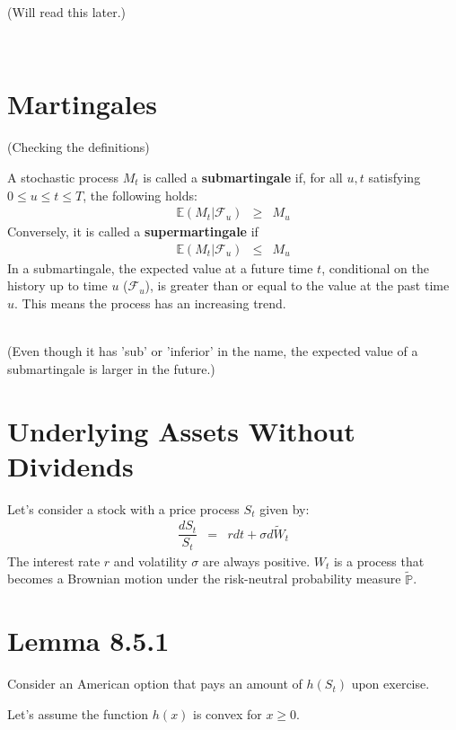 \documentclass[uplatex,a4j,12pt,dvipdfmx]{jsarticle}
\begin{document}
(Will read this later.)

\ \\

\section{Martingales}

(Checking the definitions)

A stochastic process $M_t$ is called a \textbf{submartingale} if, for all $u, t$ satisfying $0 \leq u \leq t \leq T$, the following holds:
%
%
\begin{eqnarray*}
	\mathbb{E}(M_{t}|\mathcal{F}_{u})
	&\geq&
	M_{u}
\end{eqnarray*}
%
%
Conversely, it is called a \textbf{supermartingale} if
%
%
\begin{eqnarray*}
	\mathbb{E}(M_{t}|\mathcal{F}_{u})
	&\leq&
	M_{u}
\end{eqnarray*}
%
%
In a submartingale, the expected value at a future time $t$, conditional on the history up to time $u$ ($\mathcal{F}_u$), is greater than or equal to the value at the past time $u$. This means the process has an increasing trend.

\ \\

(Even though it has 'sub' or 'inferior' in the name, the expected value of a submartingale is larger in the future.)

\section{Underlying Assets Without Dividends}

Let's consider a stock with a price process $S_t$ given by:
%
%
\begin{eqnarray*}
	\dfrac{d S_{t}}{S_{t}}
	&=&
	r dt + \sigma d \tilde{W}_{t}
\end{eqnarray*}
%
%
The interest rate $r$ and volatility $\sigma$ are always positive. $W_t$ is a process that becomes a Brownian motion under the risk-neutral probability measure $\tilde{\mathbb{P}}$.


\section{Lemma 8.5.1\cite{Shreve2004}}

Consider an American option that pays an amount of $h(S_t)$ upon exercise.

Let's assume the function $h(x)$ is convex for $x \geq 0$.
\end{document}
